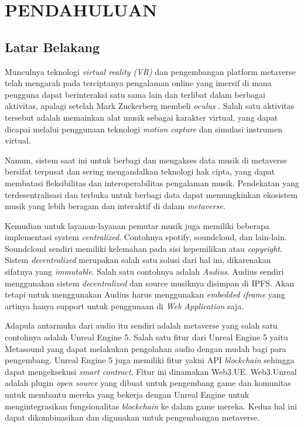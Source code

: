 \chapter{PENDAHULUAN}
\label{chap:pendahuluan}


\section{Latar Belakang}
\label{sec:latarbelakang}

Munculnya teknologi \emph{virtual reality (VR)} dan pengembangan platform metaverse telah mengarah pada terciptanya
pengalaman online yang imersif di mana pengguna dapat berinteraksi satu sama lain dan terlibat dalam berbagai aktivitas, apalagi setelah  Mark Zuckerberg
membeli \emph{oculus} \parencite{luckerson2014facebook}.
Salah satu aktivitas tersebut adalah memainkan alat musik sebagai karakter virtual, yang dapat dicapai melalui penggunaan
teknologi \emph{motion capture} dan simulasi instrumen virtual.

Namun, sistem saat ini untuk berbagi dan mengakses data musik di metaverse bersifat terpusat dan sering mengandalkan teknologi
hak cipta, yang dapat membatasi fleksibilitas dan interoperabilitas pengalaman musik. Pendekatan yang terdesentralisasi dan terbuka
untuk berbagi data dapat memungkinkan ekosistem musik yang lebih beragam dan interaktif di dalam \emph{metaverse}.

Kemudian untuk layanan-layanan pemutar musik juga memiliki beberapa implementasi system \emph{centralized}. Contohnya spotify, soundcloud, dan lain-lain.
Soundcloud sendiri memiliki kelemahan pada sisi kepemilikan atau \emph{copyright}. Sistem \emph{decentralized} merupakan salah satu solusi dari hal ini, dikarenakan
sifatnya yang \emph{immutable}. Salah satu contohnya adalah \emph{Audius}. Audius sendiri menggunakan sistem \emph{decentralized} dan source musiknya disimpan di IPFS.
Akan tetapi untuk menggunakan Audius harus menggunakan \emph{embedded iframe} yang artinya hanya support untuk penggunaan di \emph{Web Application} saja.

Adapula antarmuka dari audio itu sendiri adalah metaverse yang salah satu contohnya adalah Unreal Engine 5. Salah satu fitur dari Unreal Engine 5
yaitu Metasound yang dapat melakukan pengolahan audio dengan mudah bagi para pengembang. Unreal Engine 5 juga
memiliki fitur yakni API \emph{blockchain} sehingga dapat mengeksekusi \emph{smart contract}. Fitur ini dinamakan Web3.UE. Web3.Unreal adalah plugin
\emph{open source} yang dibuat untuk pengembang game dan komunitas untuk membantu mereka yang bekerja dengan Unreal Engine untuk mengintegrasikan
fungsionalitas \emph{blockchain} ke dalam game mereka. Kedua hal ini dapat dikombinasikan dan digunakan untuk
pengembangan metaverse.

